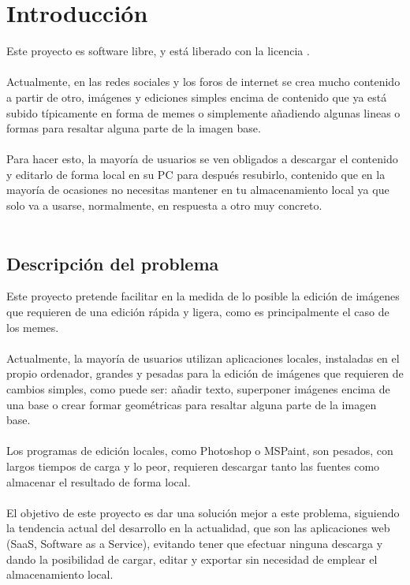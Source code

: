 \chapter{Introducción}




Este proyecto es software libre, y está liberado con la licencia \cite{gplv3}.
\\\\
Actualmente, en las redes sociales y los foros de internet se crea
mucho contenido a partir de otro, imágenes y ediciones simples 
encima de contenido que ya está subido típicamente en forma de memes 
o simplemente añadiendo algunas lineas o formas para resaltar alguna 
parte de la imagen base.
\\\\
Para hacer esto, la mayoría de usuarios se ven obligados a descargar
el contenido y editarlo de forma local en su PC para después resubirlo,
contenido que en la mayoría de ocasiones no necesitas mantener en tu 
almacenamiento local ya que solo va a usarse, normalmente, en respuesta 
a otro muy concreto.
\\\\

\section{Descripción del problema}

Este proyecto pretende facilitar en la medida de lo posible la edición de imágenes que requieren
de una edición rápida y ligera, como es principalmente el caso de los memes.
\\\\
Actualmente, la mayoría de usuarios utilizan aplicaciones locales, instaladas en el propio
ordenador, grandes y pesadas para la edición de imágenes que requieren de cambios simples, 
como puede ser: añadir texto, superponer imágenes encima de una base o crear formar geométricas
para resaltar alguna parte de la imagen base.
\\\\
Los programas de edición locales, como Photoshop o MSPaint, son pesados, con largos tiempos de
carga y lo peor, requieren descargar tanto las fuentes como almacenar el resultado de forma local.
\\\\
El objetivo de este proyecto es dar una solución mejor a este problema, siguiendo la tendencia
actual del desarrollo en la actualidad, que son las aplicaciones web (SaaS, Software as a Service), 
evitando tener que efectuar ninguna descarga y dando la posibilidad de cargar, editar y exportar sin 
necesidad de emplear el almacenamiento local.